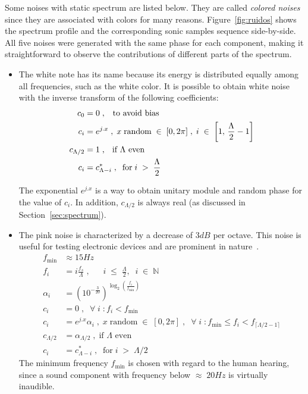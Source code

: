 Some noises with static spectrum are listed below. They are called \emph{colored noises} since they are associated with colors for many reasons.
Figure~\ref{fig:ruidos} shows the spectrum profile and the corresponding sonic samples sequence side-by-side. All five noises were generated with the same phase for each component, making it straightforward to observe the contributions of different parts of the spectrum.

\begin{itemize}
 \item The white note has its name because its energy is distributed equally among all frequencies, such as the white color. It is possible to obtain white noise with the inverse transform of the following coefficients:
\begin{equation}\label{eq:branco}
 \begin{split}
 c_0 & =0 \;\text{,\quad to avoid bias} \\
 c_i & =e^{j.x}\;,\; x \; \text{random} \; \in \; [0,2\pi]\;,\; i \; \in \; \left[1, \, \frac{\Lambda}{2}-1\right] \\
 c_{\Lambda/2} & = 1 \; \text{, \; if $\Lambda$ even}\\ 
 c_i & = c_{\Lambda - i}^*\;,\;\; \text{for}\;  i \; > \;  \frac{\Lambda}{2}
 \end{split}
\end{equation}

The exponential $e^{j.x}$ is a way to obtain unitary module and random phase for the value of $c_i$. In addition, $c_{\Lambda/2}$ is always real (as discussed in Section~\ref{sec:spectrum}).

 \item The pink noise is characterized by a decrease of $3dB$ per octave.
	 This noise is useful for testing electronic devices and are prominent in nature~\cite{Roederer}. 
\begin{equation}\label{eq:rosa}
\begin{split}
	f_{\text{min}} & \approx 15 Hz \\
	f_i  &= i \frac{f_s}{\Lambda} \;, \;\; \quad i \;\leq\; \frac{\Lambda}{2},\;\; i\;\in\;\mathbb{N}  \\
	\alpha_i & = \left(10^{-\frac{3}{20}}\right)^{\log _2 \left ( \frac{f_i}{f_{\text{min}}} \right )}  \\
	c_i & =0\;,\;\; \forall \; i \; : f_i<f_{\text{min}} \\
	c_i & =e^{j.x} \alpha_i\;, \; x \; \text{random} \; \in \; [0,2\pi]\;,\;\; \forall \; i \; : f_{\text{min}} \le f_i < f_{\lceil \Lambda/2-1 \rceil}  \\
	c_{\Lambda/2} & = \alpha_{\Lambda/2}\;, \; \text{if $\Lambda$ even} \\ 
	c_i & = c_{\Lambda - i}^*\;,\;\; \text{for}\;  i \; > \;  \Lambda/2 \qquad \qquad
\end{split}
\end{equation}
The minimum frequency $f_{\text{min}}$ is chosen with regard to the human hearing, since a sound component with frequency below $\approx\; 20Hz$ is virtually inaudible.


\end{itemize}
